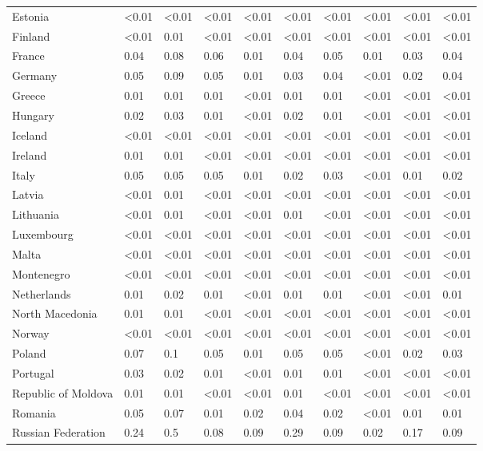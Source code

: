 \begin{longtable}[t]{llllllllll}
\addlinespace
Estonia & <0.01 & <0.01 & <0.01 & <0.01 & <0.01 & <0.01 & <0.01 & <0.01 & <0.01\\
Finland & <0.01 & 0.01 & <0.01 & <0.01 & <0.01 & <0.01 & <0.01 & <0.01 & <0.01\\
France & 0.04 & 0.08 & 0.06 & 0.01 & 0.04 & 0.05 & 0.01 & 0.03 & 0.04\\
Germany & 0.05 & 0.09 & 0.05 & 0.01 & 0.03 & 0.04 & <0.01 & 0.02 & 0.04\\
Greece & 0.01 & 0.01 & 0.01 & <0.01 & 0.01 & 0.01 & <0.01 & <0.01 & <0.01\\
\addlinespace
Hungary & 0.02 & 0.03 & 0.01 & <0.01 & 0.02 & 0.01 & <0.01 & <0.01 & <0.01\\
Iceland & <0.01 & <0.01 & <0.01 & <0.01 & <0.01 & <0.01 & <0.01 & <0.01 & <0.01\\
Ireland & 0.01 & 0.01 & <0.01 & <0.01 & <0.01 & <0.01 & <0.01 & <0.01 & <0.01\\
Italy & 0.05 & 0.05 & 0.05 & 0.01 & 0.02 & 0.03 & <0.01 & 0.01 & 0.02\\
Latvia & <0.01 & 0.01 & <0.01 & <0.01 & <0.01 & <0.01 & <0.01 & <0.01 & <0.01\\
\addlinespace
Lithuania & <0.01 & 0.01 & <0.01 & <0.01 & 0.01 & <0.01 & <0.01 & <0.01 & <0.01\\
Luxembourg & <0.01 & <0.01 & <0.01 & <0.01 & <0.01 & <0.01 & <0.01 & <0.01 & <0.01\\
Malta & <0.01 & <0.01 & <0.01 & <0.01 & <0.01 & <0.01 & <0.01 & <0.01 & <0.01\\
Montenegro & <0.01 & <0.01 & <0.01 & <0.01 & <0.01 & <0.01 & <0.01 & <0.01 & <0.01\\
Netherlands & 0.01 & 0.02 & 0.01 & <0.01 & 0.01 & 0.01 & <0.01 & <0.01 & 0.01\\
\addlinespace
North Macedonia & 0.01 & 0.01 & <0.01 & <0.01 & <0.01 & <0.01 & <0.01 & <0.01 & <0.01\\
Norway & <0.01 & <0.01 & <0.01 & <0.01 & <0.01 & <0.01 & <0.01 & <0.01 & <0.01\\
Poland & 0.07 & 0.1 & 0.05 & 0.01 & 0.05 & 0.05 & <0.01 & 0.02 & 0.03\\
Portugal & 0.03 & 0.02 & 0.01 & <0.01 & 0.01 & 0.01 & <0.01 & <0.01 & <0.01\\
Republic of Moldova & 0.01 & 0.01 & <0.01 & <0.01 & 0.01 & <0.01 & <0.01 & <0.01 & <0.01\\
\addlinespace
Romania & 0.05 & 0.07 & 0.01 & 0.02 & 0.04 & 0.02 & <0.01 & 0.01 & 0.01\\
Russian Federation & 0.24 & 0.5 & 0.08 & 0.09 & 0.29 & 0.09 & 0.02 & 0.17 & 0.09\\

\end{longtable}
